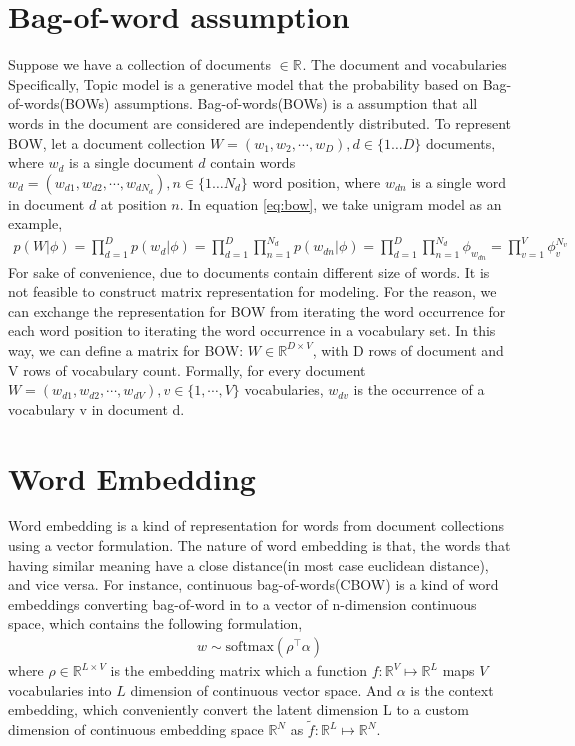\section{Bag-of-word assumption} 
Suppose we have a collection of documents $ \in\mathbb{R}^{} $. The document and vocabularies
Specifically, Topic model is a generative model that the probability based on Bag-of-words(BOWs) assumptions. Bag-of-words(BOWs) is a assumption that all words in the document are considered are independently distributed. To represent BOW, let a document collection $ W=(w_1,w_2,\cdots,w_D),d\in\{1\dots D\} $ documents, where $ w_d $ is a single document $ d $ contain words $ w_d=(w_{d1},w_{d2},\cdots,w_{dN_d}), n\in\{1\dots N_d\} $ word position, where $ w_{dn} $ is a single word in document $ d $ at position $ n $.
In equation \ref{eq:bow}, we take unigram model as an example\cite{__2015}, 
\begin{align}\label{eq:bow}
p(W|\phi)=\prod_{d=1}^{D}p(w_d|\phi)=\prod_{d=1}^{D}\prod_{n=1}^{N_d}p(w_{dn}|\phi)=\prod_{d=1}^{D}\prod_{n=1}^{N_d}\phi_{w_{dn}}=\prod_{v=1}^{V}\phi^{N_v}_{v}
\end{align}
For sake of convenience, due to documents contain different size of words. It is not feasible to construct matrix representation for modeling. For the reason, we can exchange the representation for BOW from iterating the word occurrence for each word position to iterating the word occurrence in a vocabulary set. In this way, we can define a matrix for BOW: $ W\in\mathbb{R}^{D\times V} $, with D rows of document and V rows of vocabulary count. Formally, for every document $ W=(w_{d1},w_{d2},\cdots,w_{dV}), v\in\{1,\cdots,V\} $ vocabularies, $ w_{dv} $ is the occurrence of a vocabulary v in document d.

\section{Word Embedding} \label{ch2:we}
Word embedding\cite{bengio_neural_nodate} is a kind of representation for words from document collections using a vector formulation. The nature of word embedding is that, the words that having similar meaning have a close distance(in most case euclidean distance), and vice versa. For instance, continuous bag-of-words(CBOW) \cite{mikolov_distributed_nodate} is a kind of word embeddings converting bag-of-word in to a vector of n-dimension continuous space, which contains the following formulation,
\begin{align*}
w\sim\text{softmax}(\rho^\top\alpha)
\end{align*}
where $ \rho\in\mathbb{R}^{L\times V} $ is the embedding matrix which a function $ f:\mathbb{R}^V\mapsto\mathbb{R}^{L} $ maps $ V $ vocabularies into $ L $ dimension of continuous vector space. And $ \alpha $ is the context embedding, which conveniently convert the latent dimension L to a custom dimension of continuous embedding space $ \mathbb{R}^{N} $ as $ \tilde{f}:\mathbb{R}^L\mapsto\mathbb{R}^{N} $.
